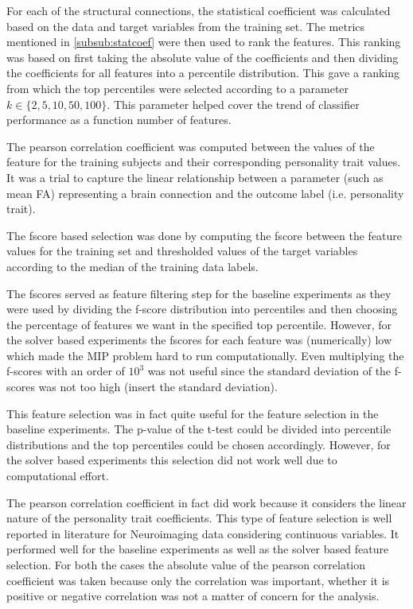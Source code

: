 \documentclass[msthesis.tex]{subfiles}
\begin{document}
For each of the structural connections, the statistical coefficient was calculated based on the data and target variables from the training set. The metrics mentioned in \autoref{subsub:statcoef} were then used to rank the features. This ranking was based on first taking the absolute value of the coefficients and then dividing the coefficients for all features into a percentile distribution. This gave a ranking from which the top percentiles were selected according to a parameter $k \in \{2,5,10,50,100\}$. This parameter helped cover the trend of classifier performance as a function number of features.  

\iffalse
The pearson correlation coefficient was computed between the values of the feature for the training subjects and their corresponding personality trait values. It was a trial to capture the linear relationship between a parameter (such as mean FA) representing a brain connection and the outcome label (i.e. personality trait).

The fscore based selection was done by computing the fscore between the feature values for the training set and thresholded values of the target variables according to the median of the training data labels. 

The fscores served as feature filtering step for the baseline experiments as they were used by dividing the f-score distribution into percentiles and then choosing the percentage of features we want in the specified top percentile. However, for the solver based experiments the fscores for each feature was (numerically) low which made the MIP problem hard to run computationally. Even multiplying the f-scores with an order of $10^3$ was not useful since the standard deviation of the f-scores was not too high (insert the standard deviation). 

This feature selection was in fact quite useful for the feature selection in the baseline experiments. The p-value of the t-test could be divided into percentile distributions and the top percentiles could be chosen accordingly. However, for the solver based experiments this selection did not work well due to computational effort. 

The pearson correlation coefficient in fact did work because it considers the linear nature of the personality trait coefficients. This type of feature selection is well reported in literature for Neuroimaging data considering continuous variables. It performed well for the baseline experiments as well as the solver based feature selection. For both the cases the absolute value of the pearson correlation coefficient was taken because only the correlation was important, whether it is positive or negative correlation was not a matter of concern for the analysis.
\end{document}
